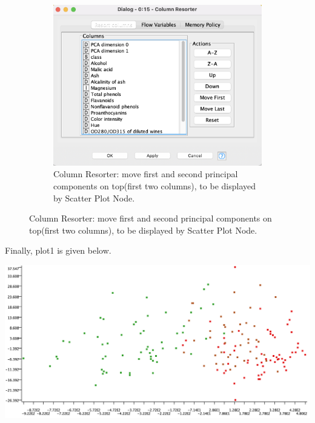\documentclass[11pt]{article}
\begin{document}
\begin{figure}[H]
\begin{subfigure}{0.4\textwidth}
					\includegraphics[width=\textwidth]{res/t1/t11/t11-column-resorter-conf}
					\caption{Column Resorter: move first and second principal components on top(first two columns), to be displayed by Scatter Plot Node.}
					\label{fig:second}
				\end{subfigure}
				\hfill
			\end{figure}
			\fi
			Finally, plot1 is given below.
			\iftrue
			\begin{center}
				\includegraphics[scale=0.5]{res/t1/t11/t11-plot1}
			\end{center}
			\fi
\end{document}
